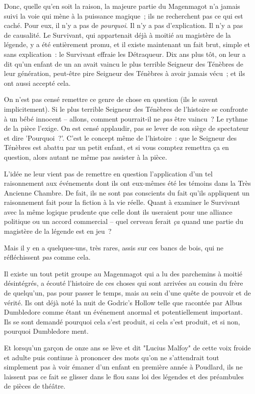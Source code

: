 Donc, quelle qu'en soit la raison, la majeure partie du Magenmagot n'a jamais suivi la voie qui mène à la puissance magique~; ils ne recherchent pas ce qui est caché. Pour eux, il n'y a pas de \emph{pourquoi}. Il n'y a pas d'explication. Il n'y a pas de causalité. Le Survivant, qui appartenait déjà à moitié au magistère de la légende, y a été entièrement promu, et il existe maintenant un fait brut, simple et sans explication~: le Survivant effraie les Détraqueur. Dix ans plus tôt, on leur a dit qu'un enfant de un an avait vaincu le plus terrible Seigneur des Ténèbres de leur génération, peut-être pire Seigneur des Ténèbres à avoir jamais vécu~; et ils ont aussi accepté cela.

On n'est pas censé remettre ce genre de chose en question (ils le savent implicitement). Si le plus terrible Seigneur des Ténèbres de l'histoire se confronte à un bébé innocent -- allons, comment pourrait-il ne \emph{pas} être vaincu~? Le rythme de la pièce l'exige. On est censé applaudir, pas se lever de son siège de spectateur et dire 'Pourquoi~?'. C'est le concept même de l'histoire~: que le Seigneur des Ténèbres est abattu par un petit enfant, et si vous comptez remettra ça en question, alors autant ne même pas assister à la pièce.

L'idée ne leur vient pas de remettre en question l'application d'un tel raisonnement aux événements dont ils ont eux-mêmes été les témoins dans la Très Ancienne Chambre. De fait, ils ne sont pas conscients du fait qu'ils appliquent un raisonnement fait pour la fiction à la vie réelle. Quant à examiner le Survivant avec la même logique prudente que celle dont ils useraient pour une alliance politique ou un accord commercial -- quel cerveau ferait \emph{ça} quand une partie du magistère de la légende est en jeu~?

Mais il y en a quelques-uns, très rares, assis sur ces bancs de bois, qui ne réfléchissent \emph{pas} comme cela.

Il existe un tout petit groupe au Magenmagot qui a lu des parchemins à moitié désintégrés, a écouté l'histoire de ces choses qui sont arrivées au cousin du frère de quelqu'un, pas pour passer le temps, mais au sein d'une quête de pouvoir et de vérité. Ils ont déjà noté la nuit de Godric's Hollow telle que racontée par Albus Dumbledore comme étant un événement anormal et potentiellement important. Ils se sont demandé pourquoi cela s'est produit, si cela s'est produit, et si non, pourquoi Dumbledore ment.

Et lorsqu'un garçon de onze ans se lève et dit "Lucius Malfoy" de cette voix froide et adulte puis continue à prononcer des mots qu'on ne s'attendrait tout simplement pas à voir émaner d'un enfant en première année à Poudlard, ils ne laissent pas ce fait se glisser dans le flou sans loi des légendes et des préambules de pièces de théâtre.

